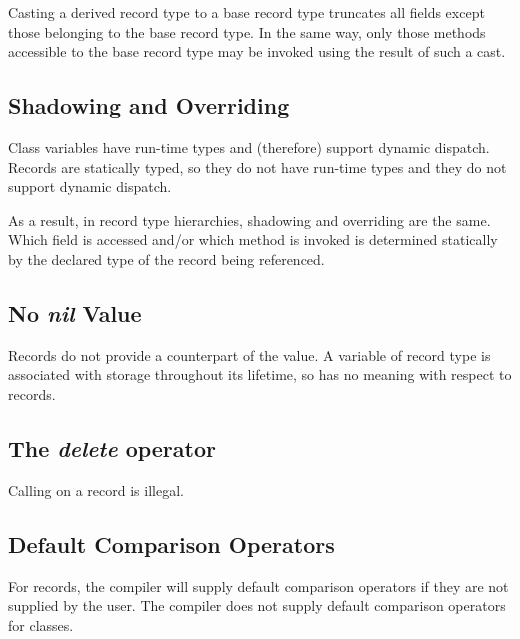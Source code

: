Casting a derived record type to a base record type truncates all 
fields except those belonging to the base record type.  In the same way, only
those methods accessible to the base record type may be invoked using the result
of such a cast.

\subsection{Shadowing and Overriding}
\label{Base_Method_Differences}

Class variables have run-time types and (therefore) support dynamic dispatch.
Records are statically typed, so they do not have run-time types and they do not
support dynamic dispatch.

As a result, in record type hierarchies, shadowing and overriding are the same.  
Which field is accessed
and/or which method is invoked is determined statically by the declared type of
the record being referenced.

\subsection{No {\em nil} Value}

Records do not provide a counterpart of the  value.  A variable of
record type is associated with storage throughout its lifetime, so 
has no meaning with respect to records.

\subsection{The {\em delete} operator}
\label{Record_Delete_Illegal}

Calling  on a record is illegal.


\subsection{Default Comparison Operators}
\label{Comparison_Operator_Differences}

For records, the compiler will supply default comparison operators if they are
not supplied by the user.  The compiler does not supply default comparison
operators for classes.

